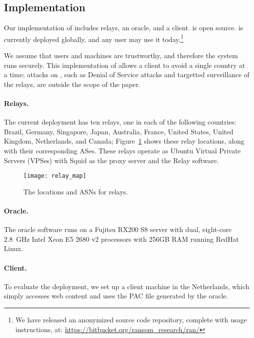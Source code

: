 \subsection{Implementation}

Our implementation of \system{} includes relays, an oracle, and 
a client. \system{} is open source.  \system{} is currently deployed globally, and
any user may use it today.\footnote{We have released an anonymized source code repository,
complete with usage instructions, at: \url{https://bitbucket.org/ransom_research/ran/}}

We assume that users and machines are trustworthy, and therefore the system runs 
securely.  This implementation of \system{} allows a client to avoid a single country 
at a time; attacks on \system{}, such as Denial of Service attacks and targetted 
surveillance of the relays, are outside the scope of the paper.

\paragraph{Relays.}  The current deployment has ten relays, one in each
of the following
countries: Brazil,  Germany, Singapore, Japan, Australia, France, United
States, United Kingdom, Netherlands, and Canada; Figure~\ref{fig:relay_locations}
shows these relay locations, along with their corresponding ASes. These relays operate
as Ubuntu Virtual Private Servers (VPSes) with Squid as the proxy
server and the \system{} Relay software.

\begin{figure}[t!]
\centering
\texttt{[image: relay\_map]}
\caption{The locations and ASNs for \system{} relays.}
\label{fig:relay_locations}
\end{figure}

\paragraph{Oracle.}  The oracle software runs on a Fujitsu RX200 S8 server with dual, 
eight-core 2.8~GHz Intel Xeon E5 2680 v2 processors with 256GB RAM running 
RedHat Linux. 

\paragraph{Client.} To evaluate the \system{} deployment, we set up a client 
machine in the Netherlands, which simply accesses web content and uses the PAC 
file generated by the oracle. 

